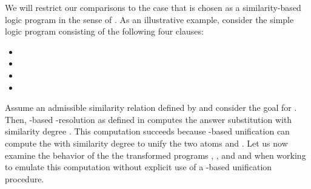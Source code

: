 \documentclass{sigplanconf}
\theoremstyle{definition}
\theoremstyle{plain}
\begin{document}
We will restrict our comparisons  to the case that  is chosen as a similarity-based logic program in the sense of \cite{Ses02}. As an illustrative example, consider  the simple logic program  consisting of the following four clauses:
\begin{itemize}
    \item 
    \item 
    \item 
    \item 
\end{itemize}

Assume an admissible similarity relation defined by  and consider the goal  for . Then, -based -resolution as defined in \cite{Ses02} computes the answer substitution  with similarity degree . This computation succeeds because -based unification can compute the   with similarity degree  to unify the two atoms  and . Let us now examine the behavior of the the transformed programs , ,  and  and when working to emulate this computation without  explicit use of a -based unification procedure.
\end{document}
